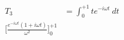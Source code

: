 \documentclass[preview]{standalone}
\begin{document}
\begin{align*}
T_{3}&= \int_{0}^{+1}t e^{-i\omega t} \ dt \\\big[\frac{e^{-i\omega t}(1+i\omega t)}{\omega^{2}}]_{0}^{+1} \\
\end{align*}
\end{document}
